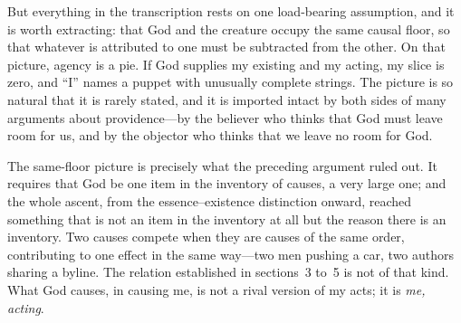 But everything in the transcription rests on one load-bearing assumption, and it is worth extracting: that God and the creature occupy the same causal floor, so that whatever is attributed to one must be subtracted from the other. On that picture, agency is a pie. If God supplies my existing and my acting, my slice is zero, and ``I'' names a puppet with unusually complete strings. The picture is so natural that it is rarely stated, and it is imported intact by both sides of many arguments about providence---by the believer who thinks that God must leave room for us, and by the objector who thinks that we leave no room for God.

The same-floor picture is precisely what the preceding argument ruled out. It requires that God be one item in the inventory of causes, a very large one; and the whole ascent, from the essence--existence distinction onward, reached something that is not an item in the inventory at all but the reason there is an inventory. Two causes compete when they are causes of the same order, contributing to one effect in the same way---two men pushing a car, two authors sharing a byline. The relation established in sections~3 to~5 is not of that kind. What God causes, in causing me, is not a rival version of my acts; it is \emph{me, acting}.

